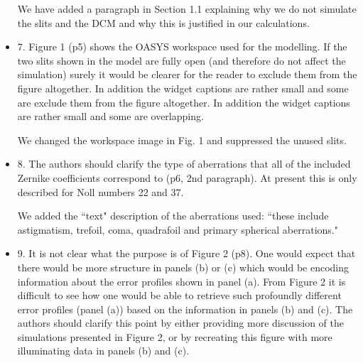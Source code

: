 \documentclass[11pt]{letter} %
\newcommand{\inred}[1]{{\color{red}#1}}
\begin{document}
\begin{letter}{}
\begin{itemize}
    \inred{
    We have added a paragraph in Section 1.1 explaining why we do not simulate the slits and the DCM and why this is justified in our calculations.  
    }
    

    \item 7. Figure 1 (p5) shows the OASYS workspace used for the modelling. If the two slits shown in the model are fully open (and therefore do not affect the simulation) surely it would be clearer for the reader to exclude them from the figure altogether. In addition the widget captions are rather small and some are exclude them from the figure altogether. In addition the widget captions are rather small and some are overlapping.
    
    \inred{We changed the workspace image in Fig. 1 and suppressed the unused slits.}
    

    \item 8. The authors should clarify the type of aberrations that all of the included Zernike coefficients correspond to (p6, 2nd paragraph). At present this is only described for Noll numbers 22 and 37.
    
    \inred{We added the ``text" description of the aberrations used: ``these include astigmatism, trefoil, coma, quadrafoil and primary spherical aberrations."}
    

    \item 9. It is not clear what the purpose is of Figure 2 (p8). One would expect that there would be more structure in panels (b) or (c) which would be encoding information about the error profiles shown in panel (a). From Figure 2 it is difficult to see how one would be able to retrieve such profoundly different error profiles (panel (a)) based on the information in panels (b) and (c). The authors should clarify this point by either providing more discussion of the simulations presented in Figure 2, or by recreating this figure with more illuminating data in panels (b) and (c).
    

\end{itemize}
\end{letter}
\end{document}
